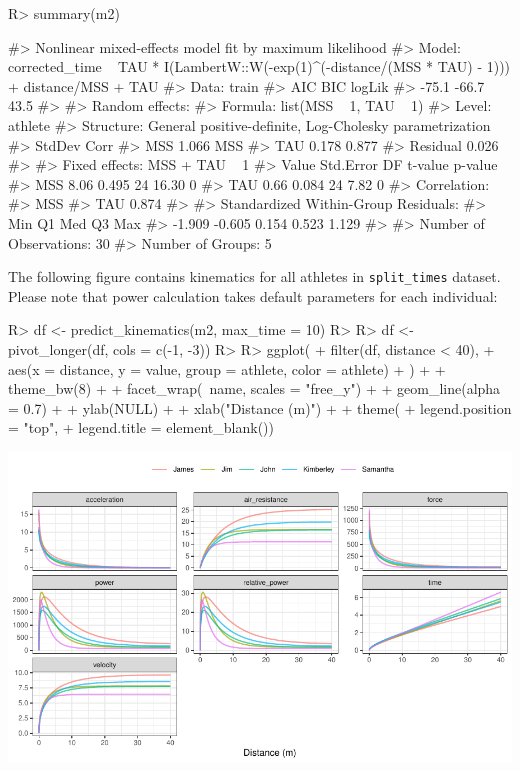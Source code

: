 \documentclass[
]{jss}
\begin{document}
\begin{CodeChunk}
\begin{CodeInput}
R> summary(m2)
\end{CodeInput}
\begin{CodeOutput}
#> Nonlinear mixed-effects model fit by maximum likelihood
#>   Model: corrected_time ~ TAU * I(LambertW::W(-exp(1)^(-distance/(MSS *      TAU) - 1))) + distance/MSS + TAU 
#>  Data: train 
#>     AIC   BIC logLik
#>   -75.1 -66.7   43.5
#> 
#> Random effects:
#>  Formula: list(MSS ~ 1, TAU ~ 1)
#>  Level: athlete
#>  Structure: General positive-definite, Log-Cholesky parametrization
#>          StdDev Corr 
#> MSS      1.066  MSS  
#> TAU      0.178  0.877
#> Residual 0.026       
#> 
#> Fixed effects: MSS + TAU ~ 1 
#>     Value Std.Error DF t-value p-value
#> MSS  8.06     0.495 24   16.30       0
#> TAU  0.66     0.084 24    7.82       0
#>  Correlation: 
#>     MSS  
#> TAU 0.874
#> 
#> Standardized Within-Group Residuals:
#>    Min     Q1    Med     Q3    Max 
#> -1.909 -0.605  0.154  0.523  1.129 
#> 
#> Number of Observations: 30
#> Number of Groups: 5
\end{CodeOutput}
\end{CodeChunk}

The following figure contains kinematics for all athletes in \texttt{split\_times} dataset. Please note that power calculation takes default parameters for each individual:

\begin{CodeChunk}
\begin{CodeInput}
R> df <- predict_kinematics(m2, max_time = 10)
R> 
R> df <- pivot_longer(df, cols = c(-1, -3))
R> 
R> ggplot(
+   filter(df, distance < 40),
+   aes(x = distance, y = value, group = athlete, color = athlete)
+ ) +
+   theme_bw(8) +
+   facet_wrap(~name, scales = "free_y") +
+   geom_line(alpha = 0.7) +
+   ylab(NULL) +
+   xlab("Distance (m)") +
+   theme(
+     legend.position = "top",
+     legend.title = element_blank())
\end{CodeInput}


\begin{center}\includegraphics[width=1\linewidth]{paper_files/figure-latex/unnamed-chunk-11-1} \end{center}

\end{CodeChunk}
\end{document}
